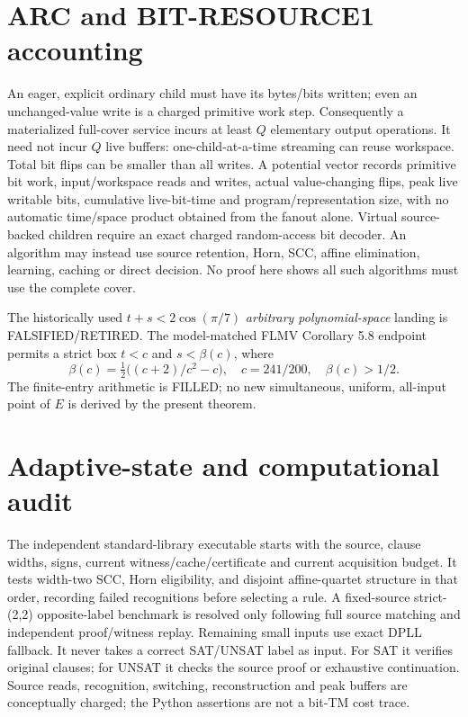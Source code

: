 \documentclass[11pt]{article}
\begin{document}
\section{ARC and BIT-RESOURCE1 accounting}
An eager, explicit ordinary child must have its bytes/bits written; even an unchanged-value write is a charged primitive work step. Consequently a materialized full-cover service incurs at least $Q$ elementary output operations. It need not incur $Q$ live buffers: one-child-at-a-time streaming can reuse workspace. Total bit flips can be smaller than all writes. A potential vector records primitive bit work, input/workspace reads and writes, actual value-changing flips, peak live writable bits, cumulative live-bit-time and program/representation size, with no automatic time/space product obtained from the fanout alone. Virtual source-backed children require an exact charged random-access bit decoder. An algorithm may instead use source retention, Horn, SCC, affine elimination, learning, caching or direct decision. No proof here shows all such algorithms must use the complete cover.

The historically used $t+s<2\cos(\pi/7)$ \emph{arbitrary polynomial-space} landing is FALSIFIED/RETIRED. The model-matched FLMV Corollary 5.8 endpoint permits a strict box $t<c$ and $s<\beta(c)$, where
\[
\beta(c)=\tfrac12\bigl((c+2)/c^2-c\bigr), \quad c=241/200,\quad \beta(c)>1/2.
\]
The finite-entry arithmetic is FILLED; no new simultaneous, uniform, all-input point of $E$ is derived by the present theorem.

\section{Adaptive-state and computational audit}
The independent standard-library executable starts with the source, clause widths, signs, current witness/cache/certificate and current acquisition budget. It tests width-two SCC, Horn eligibility, and disjoint affine-quartet structure in that order, recording failed recognitions before selecting a rule. A fixed-source strict-(2,2) opposite-label benchmark is resolved only following full source matching and independent proof/witness replay. Remaining small inputs use exact DPLL fallback. It never takes a correct SAT/UNSAT label as input. For SAT it verifies original clauses; for UNSAT it checks the source proof or exhaustive continuation. Source reads, recognition, switching, reconstruction and peak buffers are conceptually charged; the Python assertions are not a bit-TM cost trace.
\end{document}

